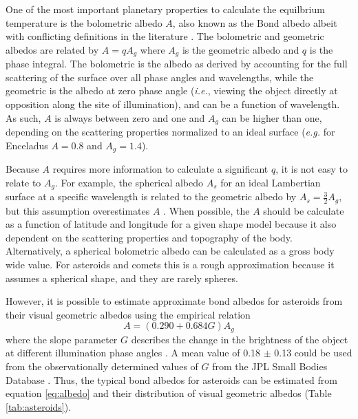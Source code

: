 \documentclass[a4paper,fleqn,usenatbib]{mnras}
\begin{document}
One of the most important planetary properties to calculate the equilbrium temperature is the bolometric albedo $A$, also known as the Bond albedo albeit with conflicting definitions in the literature \citep{1916PNAS....2...74R, 1981A&A...104...42H, 1999PCEC...24..573G,2016AJ....152..209M}. The bolometric and geometric albedos are related by $A = qA_g$ where $A_g$ is the geometric albedo and $q$ is the phase integral. The bolometric is the albedo as derived by accounting for the full scattering of the surface over all phase angles and wavelengths, while the geometric is the albedo at zero phase angle (\emph{i.e.}, viewing the object directly at opposition along the site of illumination), and can be a function of wavelength. As such, $A$ is always between zero and one and $A_g$ can be higher than one, depending on the scattering properties normalized to an ideal surface (\emph{e.g.} for Enceladus $A=0.8$ and $A_g=1.4$).

Because $A$ requires more information to calculate a significant $q$, it is not easy to relate to $A_g$. For example, the spherical albedo $A_s$ for an ideal Lambertian surface at a specific wavelength is related to the geometric albedo by $A_s=\frac{3}{2}A_g$, but this assumption overestimates $A$ \citep{2016ApJ...822...76D}. When possible, the $A$ should be calculate as a function of latitude and longitude for a given shape model because it also dependent on the scattering properties and topography of the body. Alternatively, a spherical bolometric albedo can be calculated as a gross body wide value. For asteroids and comets this is a rough approximation because it assumes a spherical shape, and they are rarely spheres.

However, it is possible to estimate approximate bond albedos for asteroids from their visual geometric albedos using the empirical relation
\begin{equation} \label{eq:albedo}
A=(0.290+0.684G)A_g
\end{equation}
where the slope parameter $G$ describes the change in the brightness of the object at different illumination phase angles \citep{2008Icar..195..674S}. A mean value of 0.18 $\pm$ 0.13 could be used from the observationally determined values of $G$ from the JPL Small Bodies Database \citep{2013PhDT.......424C}. Thus, the typical bond albedos for asteroids can be estimated from equation \ref{eq:albedo} and their distribution of visual geometric albedos (Table \ref{tab:asteroids}).
\end{document}
